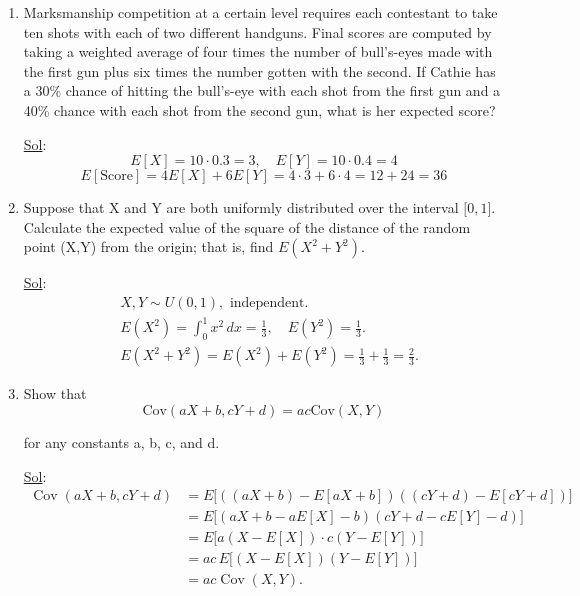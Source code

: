 \begin{enumerate}
	\item[4.] Marksmanship competition at a certain level requires each contestant to take ten shots with each of two different handguns. Final scores are computed by taking a weighted average of four times the number of bull’s-eyes made with the first gun plus six times the number gotten with the second. If Cathie has a 30\% chance of hitting the bull’s-eye with each shot from the first gun and a 40\% chance with each shot from the second gun, what is her expected score?

	      \underline{Sol}: \\

	      \[
		      E[X]=10\cdot0.3=3,\quad E[Y]=10\cdot0.4=4
	      \]
	      \[
		      E[\text{Score}]=4E[X]+6E[Y]=4\cdot3+6\cdot4=12+24=36
	      \]

	\item[10.] Suppose that X and Y are both uniformly distributed over the interval \(\lbrack 0, 1 \rbrack\). Calculate the expected value of the square of the distance of the random point (X,Y) from the origin; that is, find \(E(X^2 + Y^2)\).

	      \underline{Sol}: \\
	      \[
		      \begin{aligned}
			       & X,Y\sim U(0,1),\text{ independent}.                     \\
			       & E(X^2)=\int_0^1 x^2\,dx = \frac13,\quad E(Y^2)=\frac13. \\
			       & E(X^2+Y^2)=E(X^2)+E(Y^2)=\frac13+\frac13=\frac23.
		      \end{aligned}
	      \]

	\item[14.] Show that
	      \[
		      \textrm{Cov}(aX + b, cY + d) = ac \textrm{Cov}(X, Y)
	      \]

	      for any constants a, b, c, and d.

	      \underline{Sol}: \\

	      \[
		      \begin{aligned}
			      \operatorname{Cov}(aX+b, cY+d) & = E\big[((aX+b)-E[aX+b])((cY+d)-E[cY+d])\big] \\
			                                     & = E\big[(aX+b - aE[X]-b)(cY+d - cE[Y]-d)\big] \\
			                                     & = E\big[a(X-E[X])\cdot c(Y-E[Y])\big]         \\
			                                     & = ac\,E\big[(X-E[X])(Y-E[Y])\big]             \\
			                                     & = ac\operatorname{Cov}(X,Y).
		      \end{aligned}
	      \]


\end{enumerate}

